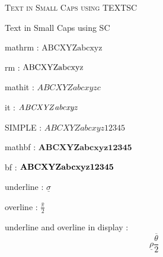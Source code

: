 \documentclass{article}
\begin{document}
\textsc{Text in Small Caps using TEXTSC}

{\sc Text in Small Caps using SC}

mathrm : $\mathrm{ABCXYZ}\mathrm{abcxyz}$

rm : ${\rm ABCXYZ}{\rm abcxyz}$

mathit : $\mathit{ABCXYZ}\mathit{abcxyzc}$

it : ${\it ABCXYZ}{\it abcxyz}$

SIMPLE : $ABCXYZabcxyz12345$





mathbf : $\mathbf{ABCXYZ}\mathbf{abcxyz}\mathbf{12345}$

bf : ${\bf ABCXYZ}{\bf abcxyz}{\bf 12345}$ 


underline : $\underline{\sigma}$

overline : $\overline{\frac{\pi}{2}}$

underline and overline in display : $$\underline{\rho} \overline{\frac{\theta}{2}}$$
\end{document}
